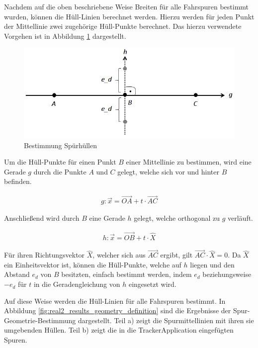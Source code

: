 Nachdem auf die oben beschriebene Weise Breiten für alle Fahrspuren bestimmt wurden, können die Hüll-Linien
berechnet werden. Hierzu werden für jeden Punkt der Mittellinie zwei zugehörige Hüll-Punkte berechnet.
Das hierzu verwendete Vorgehen ist in Abbildung \ref{fig:real2_envelope_definition_concept} dargestellt.

\begin{figure}[H]
    \centering
    \includegraphics[width=0.5\linewidth]{resources/img/umsetzung/U2/calc_env_point}
    \caption{Bestimmung Spürhüllen}
    \label{fig:real2_envelope_definition_concept}
\end{figure}

Um die Hüll-Punkte für einen Punkt $B$ einer Mittellinie zu bestimmen, wird eine Gerade $g$ durch die
Punkte $A$ und $C$ gelegt, welche sich vor und hinter $B$ befinden.

\begin{ceqn}
\begin{align}
    g: \vec{x} = \overrightarrow{OA} + t \cdot \overrightarrow{AC}
\end{align}
\end{ceqn}

Anschließend wird durch $B$ eine Gerade $h$ gelegt, welche orthogonal zu $g$ verläuft.

\begin{ceqn}
\begin{align}
    h: \vec{x} = \overrightarrow{OB} + t \cdot \hat{X}
\end{align}
\end{ceqn}

Für ihren Richtungsvektor $\hat{X}$, welcher sich aus $\overrightarrow{AC}$ ergibt, gilt
$\overrightarrow{AC} \cdot \hat{X} = 0$. Da $\hat{X}$ ein Einheitsvektor
ist, können die Hüll-Punkte, welche auf $h$ liegen und den Abstand $e_d$ von $B$ besitzten, einfach
bestimmt werden, indem $e_d$ beziehungsweise $-e_d$ für $t$ in die Geradengleichung von $h$ eingesetzt wird.

Auf diese Weise werden die Hüll-Linien für alle Fahrspuren bestimmt. In Abbildung \ref{fig:real2_results_geometry_definition} sind die
Ergebnisse der Spur-Geometrie-Bestimmung dargestellt. Teil a) zeigt die Spurmittellinien mit ihren
sie umgebenden Hüllen. Teil b) zeigt die in die TrackerApplication eingefügten Spuren.


